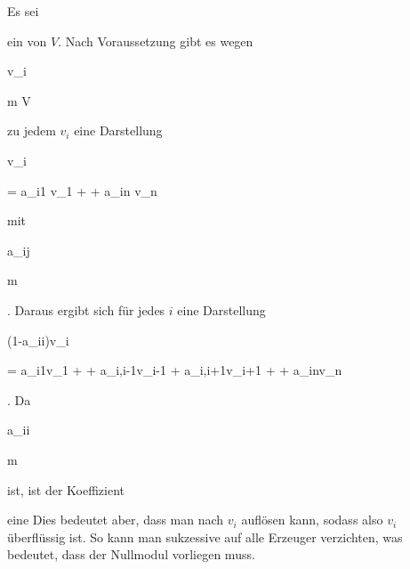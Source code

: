 {


Es sei

 ein
von $V$. Nach Voraussetzung gibt es wegen


\mavergleichskette

{\vergleichskette

{ v_i
}

{ \in }{ {\mathfrak m} V
}

{  }{
}

{    }{
}

{   }{
}

}
{}{}{}
zu jedem $v_i$ eine Darstellung


\mavergleichskettedisp

{\vergleichskette

{ v_i
}

{ =} { a_{i1} v_1 + \cdots +  a_{in} v_n
}

{ } {
}

{ } {
}

{ } {
}

}
{}{}{}
mit


\mavergleichskette

{\vergleichskette

{ a_{ij}
}

{ \in }{ {\mathfrak m}
}

{  }{
}

{    }{
}

{   }{
}

}
{}{}{.}
Daraus ergibt sich für jedes $i$ eine Darstellung


\mavergleichskettedisp

{\vergleichskette

{ (1-a_{ii})v_i
}

{ =} { a_{i1}v_1 + \cdots + a_{i,i-1}v_{i-1} + a_{i,i+1}v_{i+1} + \cdots + a_{in}v_n
}

{ } {
}

{ } {
}

{ } {
}

}
{}{}{.}
Da


\mavergleichskette

{\vergleichskette

{ a_{ii}
}

{ \in }{ {\mathfrak m}
}

{  }{
}

{    }{
}

{   }{
}

}
{}{}{}
ist, ist der Koeffizient

 eine
Dies bedeutet aber, dass man nach $v_i$ auflösen kann, sodass also $v_i$ überflüssig ist. So kann man sukzessive auf alle Erzeuger verzichten, was bedeutet, dass der Nullmodul vorliegen muss.


}
